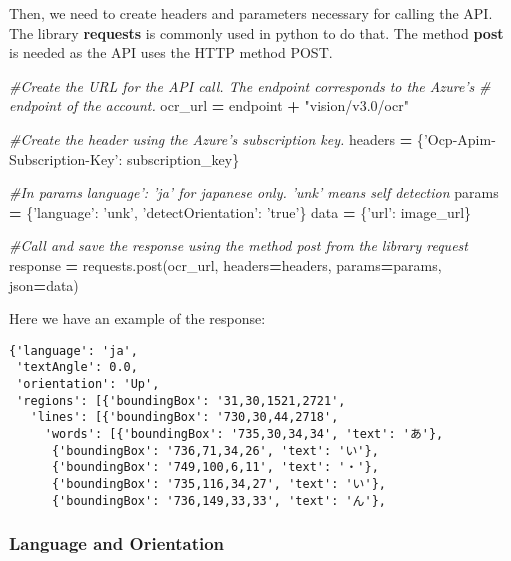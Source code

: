 \documentclass[
]{article}
\newenvironment{Shaded}{\begin{snugshade}}{\end{snugshade}}
\newcommand{\CommentTok}[1]{\textcolor[rgb]{0.56,0.35,0.01}{\textit{#1}}}
\newcommand{\NormalTok}[1]{#1}
\newcommand{\OperatorTok}[1]{\textcolor[rgb]{0.81,0.36,0.00}{\textbf{#1}}}
\newcommand{\StringTok}[1]{\textcolor[rgb]{0.31,0.60,0.02}{#1}}
\begin{document}
Then, we need to create headers and parameters necessary for calling the
API. The library \textbf{requests} is commonly used in python to do
that. The method \textbf{post} is needed as the API uses the HTTP method
POST.

\begin{Shaded}
\begin{Highlighting}[]
\CommentTok{#Create the URL for the API call. The endpoint corresponds to the Azure's }
\CommentTok{# endpoint of the account.}
\NormalTok{ocr_url }\OperatorTok{=}\NormalTok{ endpoint }\OperatorTok{+} \StringTok{"vision/v3.0/ocr"} 

\CommentTok{#Create the header using the Azure's subscription key.}
\NormalTok{headers }\OperatorTok{=}\NormalTok{ \{}\StringTok{'Ocp-Apim-Subscription-Key'}\NormalTok{: subscription_key\} }

\CommentTok{#In params language': 'ja' for japanese only. 'unk' means self detection }
\NormalTok{params }\OperatorTok{=}\NormalTok{ \{}\StringTok{'language'}\NormalTok{: }\StringTok{'unk'}\NormalTok{, }\StringTok{'detectOrientation'}\NormalTok{: }\StringTok{'true'}\NormalTok{\} }
\NormalTok{data }\OperatorTok{=}\NormalTok{ \{}\StringTok{'url'}\NormalTok{: image_url\}}

\CommentTok{#Call and save the response using the method post from the library request}
\NormalTok{response }\OperatorTok{=}\NormalTok{ requests.post(ocr_url, headers}\OperatorTok{=}\NormalTok{headers, params}\OperatorTok{=}\NormalTok{params, json}\OperatorTok{=}\NormalTok{data)}
\end{Highlighting}
\end{Shaded}

Here we have an example of the response:

\begin{verbatim}
{'language': 'ja',
 'textAngle': 0.0,
 'orientation': 'Up',
 'regions': [{'boundingBox': '31,30,1521,2721',
   'lines': [{'boundingBox': '730,30,44,2718',
     'words': [{'boundingBox': '735,30,34,34', 'text': 'あ'},
      {'boundingBox': '736,71,34,26', 'text': 'い'},
      {'boundingBox': '749,100,6,11', 'text': '・'},
      {'boundingBox': '735,116,34,27', 'text': 'い'},
      {'boundingBox': '736,149,33,33', 'text': 'ん'},
\end{verbatim}

\hypertarget{language-and-orientation}{%
\subsubsection{Language and
Orientation}\label{language-and-orientation}}
\end{document}
